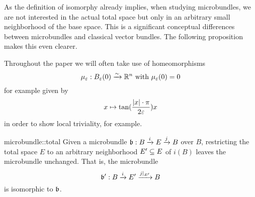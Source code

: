 \begin{myparagraph}
    As the definition of isomorphy already implies, when studying microbundles,
    we are not interested in the actual total space
    but only in an arbitrary small neighborhood of the base space.
    This is a significant conceptual differences between
    microbundles and classical vector bundles.
    The following proposition makes this even clearer.
    
    Throughout the paper we will often take use of homeomorphisms
    \[ \mu_\eps: \ball[\eps] \isomto \R^n \twith \mu_\eps(0) = 0 \]
    for example given by
    \[ x \mapsto \tan(\frac{\abs{x}\cdot\pi}{2\eps}) x \]
    in order to show local triviality, for example.
\end{myparagraph}

\begin{myproposition}{microbundle::total}{}
    Given a microbundle $\bundledef{\bb}{B}{E}{i}{j}$ over $B$,
    restricting the total space $E$ to an
    arbitrary neighborhood $E' \sub E$ of $i(B)$ leaves the microbundle unchanged.
    That is, the microbundle
    \[ \bundledef{\bb'}{B}{E'}{i}{j\restr{E'}} \]
    is isomorphic to $\bb$.
\end{myproposition}

